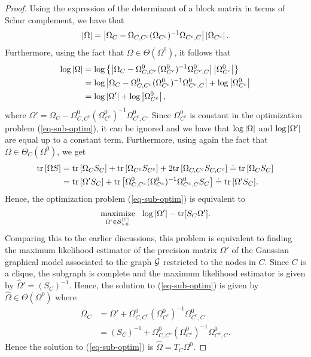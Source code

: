 \begin{proof}
    Using the expression of the determinant of a block matrix in terms of Schur complement, we have that
    \begin{equation*}
        \left|\Omega\right| 
        = \left|\Omega_C - \Omega_{C, C^c}(\Omega_{C^c})^{-1}\Omega_{C^c, C}\right| \left|\Omega_{C^c}\right|.
    \end{equation*}
    Furthermore, using the fact that $\Omega \in \Theta(\Omega^0)$, it follows that
    \begin{align*}
        \log \left|\Omega\right|
        &= \log \left\{ \left|\Omega_C - \Omega^0_{C, C^c}(\Omega^0_{C^c})^{-1}\Omega^0_{C^c, C}\right| \left|\Omega^0_{C^c}\right| \right\}\\
        &= \log \left|\Omega_C - \Omega^0_{C, C^c}(\Omega^0_{C^c})^{-1}\Omega^0_{C^c, C}\right| + \log \left|\Omega^0_{C^c}\right|\\
        &= \log \left|\Omega'\right| + \log \left|\Omega^0_{C^c}\right|,
    \end{align*}
    where $\Omega' = \Omega_C - \Omega^0_{C, C^c}(\Omega^0_{C^c})^{-1}\Omega^0_{C^c, C}$. Since $\Omega^0_{C^c}$ is constant in the optimization problem (\ref{eq-sub-optim}), it can be ignored and we have that $\log \left|\Omega\right|$ and $\log \left|\Omega'\right|$ are equal up to a constant term. Furthermore, using again the fact that $\Omega \in \Theta_C(\Omega^0)$, we get
    \begin{align*}
        {\textrm{tr}\left[\Omega S\right]}
        &= {\textrm{tr}\left[\Omega_C S_C\right]} + {\textrm{tr}\left[\Omega_{C^c} S_{C^c}\right]} + 2 {\textrm{tr}\left[\Omega_{C,C^c} S_{C,C^c}\right]} 
        \doteq {\textrm{tr}\left[\Omega_C S_C\right]} \\
        &= {\textrm{tr}\left[\Omega'S_C\right]} + {\textrm{tr}\left[\Omega^0_{C, C^c}(\Omega^0_{C^c})^{-1}\Omega^0_{C^c, C}S_C\right]}
        \doteq  {\textrm{tr}\left[\Omega'S_C\right]}.
    \end{align*}
    Hence, the optimization problem (\ref{eq-sub-optim}) is equivalent to 
    \begin{equation*}
        \underset{\Omega' \in {\mathcal{S}}_{\succ 0}^{|C|}}{{\textrm{maximize}}}\ \  \log |\Omega'| - {\textrm{tr}}[S_C\Omega'].
    \end{equation*}
    Comparing this to the earlier discussions, this problem is equivalent to finding the maximum likelihood estimator of the precision matrix $\Omega'$ of the Gaussian graphical model associated to the graph ${\mathcal{G}}$ restricted to the nodes in $C$. Since $C$ is a clique, the subgraph is complete and the maximum likelihood estimator is given by $\hat\Omega' = (S_C)^{-1}$. Hence, the solution to (\ref{eq-sub-optim}) is given by $\hat\Omega \in \Theta(\Omega^0)$ where
    \begin{align*}
        \hat\Omega_C
        &= \Omega' + \Omega^0_{C, C^c}(\Omega^0_{C^c})^{-1}\Omega^0_{C^c, C}\\
        &= (S_C)^{-1} + \Omega^0_{C, C^c}(\Omega^0_{C^c})^{-1}\Omega^0_{C^c, C}.
    \end{align*}
    Hence the solution to (\ref{eq-sub-optim}) is $\hat\Omega = T_C \Omega^0$.
\end{proof}

